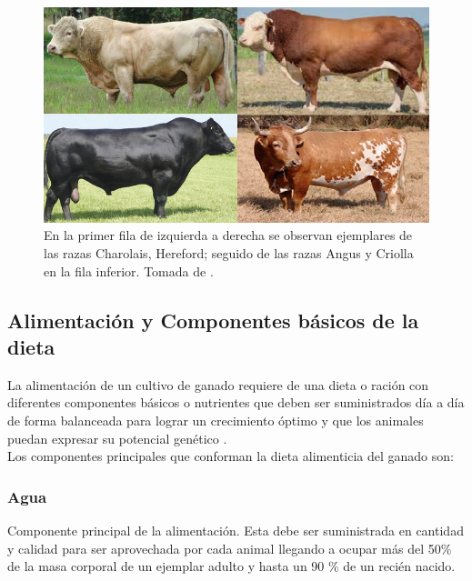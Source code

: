 \begin{figure}[H]
 \begin{center}
 \includegraphics[scale=0.8]{img/cuadrorazas.png}
 \caption{En la primer fila de izquierda a derecha se observan ejemplares de las razas Charolais, Hereford; seguido de las razas Angus y Criolla en la fila inferior.  Tomada de \cite{contextoganadero}. \label{cuadrorazaspng}}
  \end{center}
\end{figure}


\subsection{Alimentación y Componentes básicos de la dieta}
La alimentación de un cultivo de ganado requiere de una dieta o ración con diferentes componentes básicos o nutrientes que deben ser suministrados día a día de forma balanceada para lograr un crecimiento óptimo y que los animales puedan expresar su potencial genético \cite{recomendaciones}.\\

Los componentes principales que conforman la dieta alimenticia  del ganado son:
	

\subsubsection{Agua}
    Componente principal de la alimentación. Esta debe ser suministrada en cantidad y calidad para ser aprovechada por cada animal llegando a ocupar más del 50\% de la masa corporal de un ejemplar adulto y hasta un 90 \% de un recién nacido.
    	
